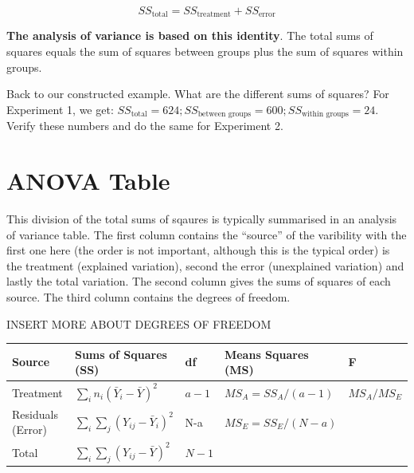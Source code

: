 \documentclass[
  letterpaper,
  DIV=11,
  numbers=noendperiod,
  oneside]{scrreprt}
\begin{document}
\[
SS_{\text{total}} = SS_{\text{treatment}} + SS_{\text{error}}
\]

\textbf{The analysis of variance is based on this identity}. The total
sums of squares equals the sum of squares between groups plus the sum of
squares within groups.

Back to our constructed example. What are the different sums of squares?
For Experiment 1, we get:
\(SS_{\text{total}} = 624; SS_{\text{between groups}} = 600; SS_{\text{within groups}} = 24\).
Verify these numbers and do the same for Experiment 2.

\section{ANOVA Table}\label{anova-table}

This division of the total sums of sqaures is typically summarised in an
analysis of variance table. The first column contains the ``source'' of
the varibility with the first one here (the order is not important,
although this is the typical order) is the treatment (explained
variation), second the error (unexplained variation) and lastly the
total variation. The second column gives the sums of squares of each
source. The third column contains the degrees of freedom.

INSERT MORE ABOUT DEGREES OF FREEDOM

\begin{longtable}[]{@{}
  >{\raggedright\arraybackslash}p{}
  >{\raggedright\arraybackslash}p{}
  >{\raggedright\arraybackslash}p{}
  >{\raggedright\arraybackslash}p{}
  >{\raggedright\arraybackslash}p{}@{}}
\toprule\noalign{}
\begin{minipage}[b]{\linewidth}\raggedright
Source
\end{minipage} & \begin{minipage}[b]{\linewidth}\raggedright
Sums of Squares (SS)
\end{minipage} & \begin{minipage}[b]{\linewidth}\raggedright
df
\end{minipage} & \begin{minipage}[b]{\linewidth}\raggedright
Means Squares (MS)
\end{minipage} & \begin{minipage}[b]{\linewidth}\raggedright
F
\end{minipage} \\
\midrule\noalign{}
\endhead
\bottomrule\noalign{}
\endlastfoot
Treatment & \(\sum_i n_i(\bar{Y}_i - \bar{Y})^2\) & \(a-1\) &
\(MS_A = SS_A / (a-1)\) & \(MS_A / MS_E\) \\
Residuals (Error) & \(\sum_i \sum_j (Y_{ij} - \bar{Y}_i)^2\) & N-a &
\(MS_E = SS_E / (N-a)\) & \\
Total & \(\sum_i \sum_j (Y_{ij} - \bar{Y})^2\) & \(N-1\) & & \\
\end{longtable}
\end{document}
